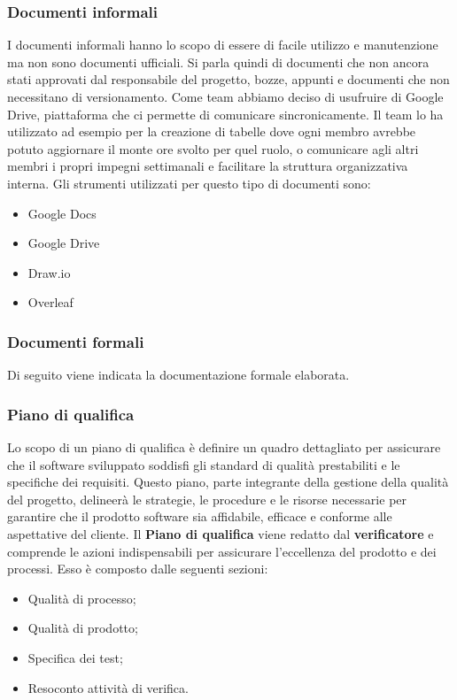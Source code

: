 \documentclass{article}
\begin{document}
\subsubsection{Documenti informali}
I documenti informali hanno lo scopo di essere di facile utilizzo e manutenzione ma non sono documenti ufficiali. Si parla quindi di documenti che non ancora stati approvati dal responsabile del progetto, bozze, appunti e documenti che non necessitano di versionamento. Come team abbiamo deciso di usufruire di Google Drive, piattaforma che ci permette di comunicare sincronicamente. Il team lo ha utilizzato ad esempio per la creazione di tabelle dove ogni membro avrebbe potuto aggiornare il monte ore svolto per quel ruolo, o comunicare agli altri membri i propri impegni settimanali e facilitare la struttura organizzativa interna. Gli strumenti utilizzati per questo tipo di documenti sono:
\begin{itemize}
    \item Google Docs
    \item Google Drive
    \item Draw.io
    \item Overleaf
\end{itemize}

\subsubsection{Documenti formali}
Di seguito viene indicata la documentazione formale elaborata.

\subsubsection*{\textbf{Piano di qualifica}}
Lo scopo di un piano di qualifica è definire un quadro dettagliato per assicurare che il software sviluppato soddisfi gli standard di qualità prestabiliti e le specifiche dei requisiti. Questo piano, parte integrante della gestione della qualità del progetto, delineerà le strategie, le procedure e le risorse necessarie per garantire che il prodotto software sia affidabile, efficace e conforme alle aspettative del cliente. Il \textbf{Piano di qualifica} viene redatto dal \textbf{verificatore} e comprende le azioni indispensabili per assicurare l'eccellenza del prodotto e dei processi. Esso è composto dalle seguenti sezioni:\begin{itemize}
    \item Qualità di processo;
    \item Qualità di prodotto;
    \item Specifica dei test;
    \item Resoconto attività di verifica.
\end{itemize}
\end{document}
